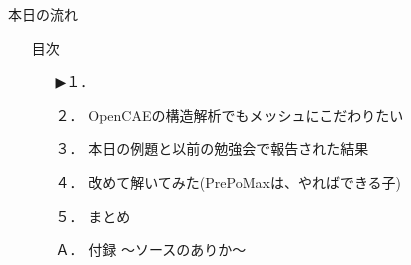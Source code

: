 \begin{frame}{本日の流れ}
  \begin{itemize}
     \item[] 目次
     \begin{itemize}[itemsep=1.3ex, leftmargin=1cm]
        \item[▶１．] 
        \item[２．] OpenCAEの構造解析でもメッシュにこだわりたい
        \item[３．] 本日の例題と以前の勉強会で報告された結果
        \item[４．] 改めて解いてみた(PrePoMaxは、やればできる子)
        \item[５．] まとめ
        \item[Ａ．] 付録 ～ソースのありか～
     \end{itemize}
  \end{itemize}
\end{frame}
